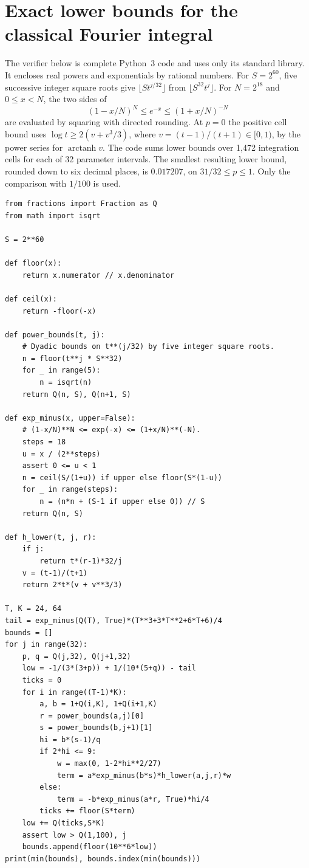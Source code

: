 \documentclass[11pt,a4paper]{article}
\numberwithin{equation}{section}
\begin{document}
\section{Exact lower bounds for the classical Fourier integral}
\label{sec:certificate}
The verifier below is complete Python~3 code and uses only its
standard library. It encloses real powers and exponentials by rational
numbers. For $S=2^{60}$, five successive integer square roots give
$\lfloor S t^{j/32}\rfloor$ from $\lfloor S^{32}t^j\rfloor$.
For $N=2^{18}$ and $0\le x<N$, the two sides of
\[
              (1-x/N)^N\le e^{-x}\le(1+x/N)^{-N}
\]
are evaluated by squaring with directed rounding. At $p=0$ the
positive cell bound uses $\log t\ge 2(v+v^3/3)$, where
$v=(t-1)/(t+1)\in[0,1)$, by the power series for $\operatorname{arctanh}v$.
The code sums lower bounds over 1,472 integration cells for each of
32 parameter intervals. The smallest resulting lower bound, rounded
down to six decimal places, is $0.017207$, on $31/32\le p\le1$.
Only the comparison with $1/100$ is used.
\begin{Verbatim}[fontsize=\small]
from fractions import Fraction as Q
from math import isqrt

S = 2**60

def floor(x):
    return x.numerator // x.denominator

def ceil(x):
    return -floor(-x)

def power_bounds(t, j):
    # Dyadic bounds on t**(j/32) by five integer square roots.
    n = floor(t**j * S**32)
    for _ in range(5):
        n = isqrt(n)
    return Q(n, S), Q(n+1, S)

def exp_minus(x, upper=False):
    # (1-x/N)**N <= exp(-x) <= (1+x/N)**(-N).
    steps = 18
    u = x / (2**steps)
    assert 0 <= u < 1
    n = ceil(S/(1+u)) if upper else floor(S*(1-u))
    for _ in range(steps):
        n = (n*n + (S-1 if upper else 0)) // S
    return Q(n, S)

def h_lower(t, j, r):
    if j:
        return t*(r-1)*32/j
    v = (t-1)/(t+1)
    return 2*t*(v + v**3/3)

T, K = 24, 64
tail = exp_minus(Q(T), True)*(T**3+3*T**2+6*T+6)/4
bounds = []
for j in range(32):
    p, q = Q(j,32), Q(j+1,32)
    low = -1/(3*(3+p)) + 1/(10*(5+q)) - tail
    ticks = 0
    for i in range((T-1)*K):
        a, b = 1+Q(i,K), 1+Q(i+1,K)
        r = power_bounds(a,j)[0]
        s = power_bounds(b,j+1)[1]
        hi = b*(s-1)/q
        if 2*hi <= 9:
            w = max(0, 1-2*hi**2/27)
            term = a*exp_minus(b*s)*h_lower(a,j,r)*w
        else:
            term = -b*exp_minus(a*r, True)*hi/4
        ticks += floor(S*term)
    low += Q(ticks,S*K)
    assert low > Q(1,100), j
    bounds.append(floor(10**6*low))
print(min(bounds), bounds.index(min(bounds)))
\end{Verbatim}
\end{document}

